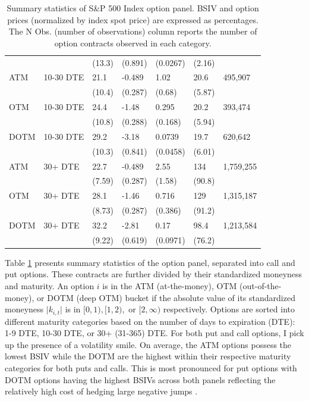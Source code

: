 \documentclass[12pt]{article}
\begin{document}
\begin{table}[!t]
\begin{tabular}{lllllll}
 &  & (13.3) & (0.891) & (0.0267) & (2.16) &  \\
ATM & 10-30 DTE & 21.1 & -0.489 & 1.02 & 20.6 & 495,907 \\
 &  & (10.4) & (0.287) & (0.68) & (5.87) &  \\
 OTM & 10-30 DTE & 24.4 & -1.48 & 0.295 & 20.2 & 393,474 \\
 &  & (10.8) & (0.288) & (0.168) & (5.94) &  \\
 DOTM & 10-30 DTE & 29.2 & -3.18 & 0.0739 & 19.7 & 620,642 \\
 &  & (10.3) & (0.841) & (0.0458) & (6.01) &  \\
ATM & 30+ DTE & 22.7 & -0.489 & 2.55 & 134 & 1,759,255 \\
 &  & (7.59) & (0.287) & (1.58) & (90.8) &  \\
OTM & 30+ DTE & 28.1 & -1.46 & 0.716 & 129 & 1,315,187 \\
 &  & (8.73) & (0.287) & (0.386) & (91.2) &  \\
DOTM & 30+ DTE & 32.2 & -2.81 & 0.17 & 98.4 & 1,213,584 \\
 &  & (9.22) & (0.619) & (0.0971) & (76.2) &  \\
\bottomrule
\end{tabular}
    \caption{Summary statistics of S\&P 500 Index option panel. BSIV and option prices (normalized by index spot price) are expressed as percentages. The N Obs. (number of observations) column reports the number of option contracts observed in each category.  }
    \label{tab:summary_stats}
\end{table}

Table \ref{tab:summary_stats} presents summary statistics of the option panel, separated into call and put options. These contracts are further divided by their standardized moneyness and maturity. An option $i$ is in the ATM (at-the-money), OTM (out-of-the-money), or DOTM (deep OTM) bucket if the absolute value of its standardized moneyness $\vert k_{i,t} \vert$ is in $[0,1), [1,2), \text{ or } [2,\infty)$ respectively. Options are sorted into different maturity categories based on the number of days to expiration (DTE): 1-9 DTE, 10-30 DTE, or 30+ (31-365) DTE. For both put and call options, I pick up the presence of a volatility smile. On average, the ATM options possess the lowest BSIV while the DOTM are the highest within their respective maturity categories for both puts and calls. This is most pronounced for put options with DOTM options having the highest BSIVs across both panels reflecting the relatively high cost of hedging large negative jumps \citep{bollerslev2011tails}.
\end{document}
